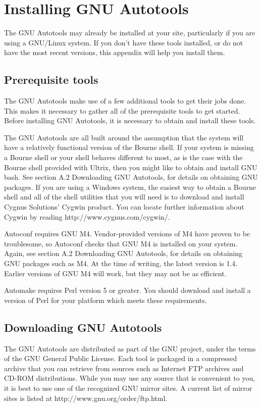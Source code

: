 \chapter{Installing GNU Autotools}

The GNU Autotools may already be installed at your site, particularly if you are using a GNU/Linux system. If you don't have these tools installed, or do not have the most recent versions, this appendix will help you install them. 

\section{Prerequisite tools}

The GNU Autotools make use of a few additional tools to get their jobs done. This makes it necessary to gather all of the prerequisite tools to get started. Before installing GNU Autotools, it is necessary to obtain and install these tools.

The GNU Autotools are all built around the assumption that the system will have a relatively functional version of the Bourne shell. If your system is missing a Bourne shell or your shell behaves different to most, as is the case with the Bourne shell provided with Ultrix, then you might like to obtain and install GNU bash. See section A.2 Downloading GNU Autotools, for details on obtaining GNU packages. If you are using a Windows system, the easiest way to obtain a Bourne shell and all of the shell utilities that you will need is to download and install Cygnus Solutions' Cygwin product. You can locate further information about Cygwin by reading http://www.cygnus.com/cygwin/.

Autoconf requires GNU M4. Vendor-provided versions of M4 have proven to be troublesome, so Autoconf checks that GNU M4 is installed on your system. Again, see section A.2 Downloading GNU Autotools, for details on obtaining GNU packages such as M4. At the time of writing, the latest version is 1.4. Earlier versions of GNU M4 will work, but they may not be as efficient.

Automake requires Perl version 5 or greater. You should download and install a version of Perl for your platform which meets these requirements. 

\section{Downloading GNU Autotools}

The GNU Autotools are distributed as part of the GNU project, under the terms of the GNU General Public License. Each tool is packaged in a compressed archive that you can retrieve from sources such as Internet FTP archives and CD-ROM distributions. While you may use any source that is convenient to you, it is best to use one of the recognized GNU mirror sites. A current list of mirror sites is listed at http://www.gnu.org/order/ftp.html.

